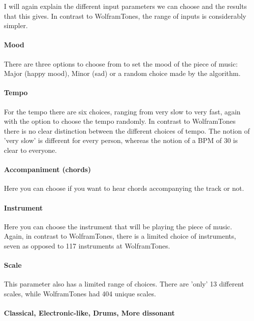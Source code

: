 \documentclass[12pt]{article}
\begin{document}
I will again explain the different input parameters we can choose and the results that this gives. In contrast to WolframTones, the range of inputs is considerably simpler. 

\paragraph{Mood}

There are three options to choose from to set the mood of the piece of music: Major (happy mood), Minor (sad) or a random choice made by the algorithm.

\paragraph{Tempo}

For the tempo there are six choices, ranging from very slow to very fast, again with the option to choose the tempo randomly. In contrast to WolframTones there is no clear distinction between the different choices of tempo. The notion of 'very slow' is different for every person, whereas the notion of a BPM of 30 is clear to everyone.

\paragraph{Accompaniment (chords)}

Here you can choose if you want to hear chords accompanying the track or not.

\paragraph{Instrument}

Here you can choose the instrument that will be playing the piece of music. Again, in contrast to WolframTones, there is a limited choice of instruments, seven as opposed to 117 instruments at WolframTones.

\paragraph{Scale}

This parameter also has a limited range of choices. There are 'only' 13 different scales, while WolframTones had 404 unique scales.

\paragraph{Classical, Electronic-like, Drums, More dissonant}
\end{document}
